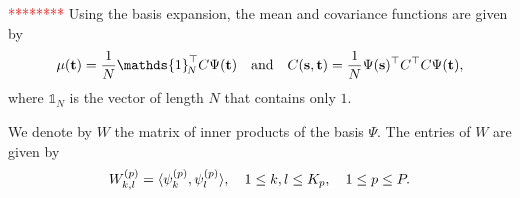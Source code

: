 \textcolor{red}{********}
Using the basis expansion, the mean and covariance functions are given by
\begin{equation}
    \mu(\pointt) = \frac{1}{N}\mathds{1}_{\!N}^\top C\Psi(\pointt) \quad\text{and}\quad C(\points, \pointt) = \frac{1}{N}\Psi(\points)^\top C^\top C \Psi(\pointt),
\end{equation}
where $\mathds{1}_{\!N}$ is the vector of length $N$ that contains only $1$.

We denote by $W$ the matrix of inner products of the basis $\Psi$. The entries of $W$ are given by
\begin{equation}
    W_{k, l}^{(p)} = \langle\psi_k^{(p)}, \psi_l^{(p)}\rangle, \quad 1 \leq k, l \leq K_p, \quad 1 \leq p \leq P.
\end{equation}

